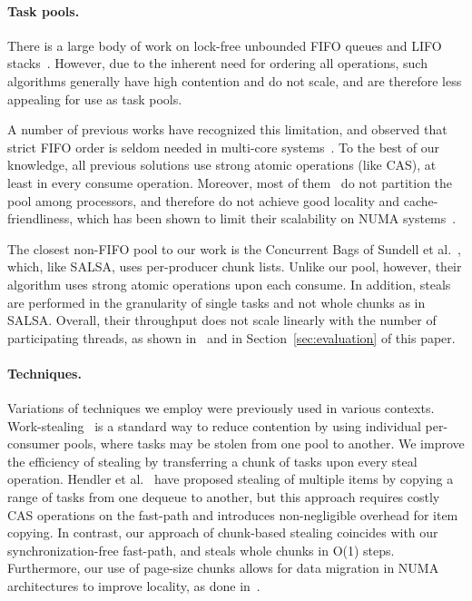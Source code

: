 \paragraph{Task pools.}
There is a large body of work on lock-free unbounded FIFO queues and LIFO
stacks~\cite{Gidenstam:2010:CLQ:1940234.1940266,Hendler:2004:SLS:1007912.1007944,
Hoffman:2007:BQ:1782394.1782423, Michael:1996:SFP:248052.248106,Moir:2005:UEI:1073970.1074013}.
However, due to the inherent need for ordering all operations, such algorithms
generally have high contention and do not scale, and are therefore less appealing for use as task pools. 

A number of previous works have recognized this limitation, and observed that strict FIFO
order is seldom needed in multi-core systems~\cite{Afek:2010:SPP:1885276.1885295,springerlink:10.1007/978-3-642-17653-1_29,
Basin:2011:CST:2075029.2075087,Sundell:2011:LAC:1989493.1989550}. To the best of our knowledge, all previous 
solutions use strong atomic operations (like CAS), at least in every consume operation. Moreover, most of
them~\cite{Afek:2010:SPP:1885276.1885295,springerlink:10.1007/978-3-642-17653-1_29,
Basin:2011:CST:2075029.2075087} do not partition the pool among processors, and therefore do not achieve
good locality and cache-friendliness, which has been shown to limit their scalability on NUMA systems~\cite{Basin:Thesis:2011}.

The closest non-FIFO pool to our work is the Concurrent Bags of
Sundell et al.~\cite{Sundell:2011:LAC:1989493.1989550}, which, like SALSA, uses 
per-producer chunk lists. Unlike our pool, however, their algorithm uses strong atomic operations
upon each consume. In addition, steals are performed in the granularity of single tasks and
not whole chunks as in SALSA. Overall, their throughput does not scale linearly with the number of participating threads,
as shown in~\cite{Sundell:2011:LAC:1989493.1989550} and in Section~\ref{sec:evaluation} of this paper.
\negspace
\paragraph{Techniques.}
Variations of techniques we employ were previously used in various contexts. 
Work-stealing~\cite{Blumofe:1999:SMC:324133.324234} is a standard way to reduce
contention by using individual per-consumer pools, where tasks may be stolen from one pool to
another. 
We improve the efficiency of stealing by transferring a chunk of tasks upon every steal
operation. Hendler et al.~\cite{Hendler:2002:NSW:571825.571876} have proposed stealing of multiple
items by copying a range of tasks from one dequeue to another, but this approach requires
costly CAS operations on the fast-path and introduces non-negligible overhead for item copying. In
contrast, our approach of chunk-based stealing coincides with our synchronization-free fast-path,
and steals whole chunks in O(1) steps. Furthermore, our use of page-size chunks allows for data
migration in NUMA architectures to improve locality, as done in~\cite{Blagodurov:2011:CNC:2002181.2002182}.

